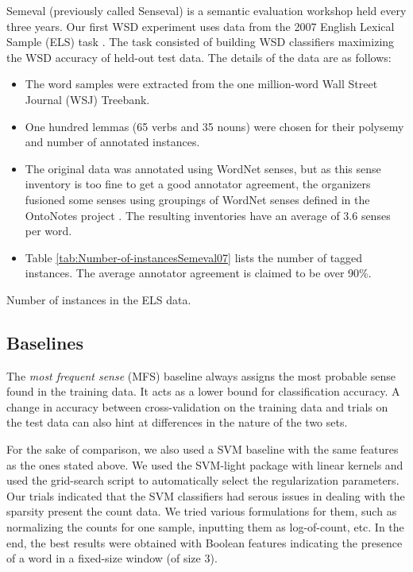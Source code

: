 \documentclass[english]{jnlp_1.4}
\begin{document}
Semeval (previously called Senseval) is a semantic evaluation workshop
held every three years. Our first WSD experiment uses data from the
2007 English Lexical Sample (ELS) task \cite{semeval07ELS}. The task
consisted of building WSD classifiers maximizing the WSD accuracy
of held-out test data. The details of the data are as follows:
\begin{itemize}
\item The word samples were extracted from the one million-word Wall Street
Journal (WSJ) Treebank. 
\item One hundred lemmas (65 verbs and 35 nouns) were chosen for their polysemy
and number of annotated instances. 
\item The original data was annotated using WordNet senses, but as this
sense inventory is too fine to get a good annotator agreement, the
organizers fusioned some senses using groupings of WordNet senses
defined in the OntoNotes project \cite{OntoNotes}. The resulting
inventories have an average of 3.6 senses per word.
\item Table \ref{tab:Number-of-instancesSemeval07} lists the number of
tagged instances. The average annotator agreement is claimed to be
over 90\%. 
\end{itemize}

\begin{table}[b]
\caption{Number of instances in the ELS data.}
\label{tab:Number-of-instancesSemeval07}

\end{table}



\subsection{Baselines}
\label{sub:English-Baselines}

The \emph{most frequent sense} (MFS) baseline always assigns
the most probable sense found in the training data. It acts as a lower
bound for classification accuracy. A change in accuracy between cross-validation
on the training data and trials on the test data can also hint at
differences in the nature of the two sets. 

For the sake of comparison, we also used a SVM baseline with the same
features as the ones stated above. We used the SVM-light package with
linear kernels and used the grid-search script to automatically select
the regularization parameters. Our trials indicated that the SVM classifiers
had serous issues in dealing with the sparsity present the count data.
We tried various formulations for them, such as normalizing the counts
for one sample, inputting them as log-of-count, etc. In the end, the
best results were obtained with Boolean features indicating the presence
of a word in a fixed-size window (of size 3). 
\end{document}
